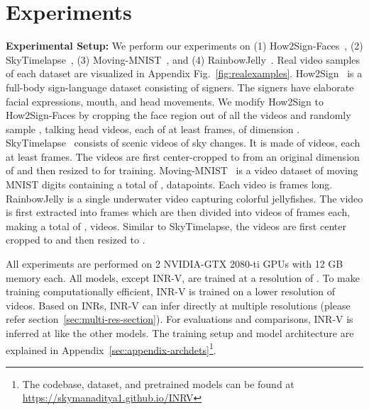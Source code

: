 \documentclass[10pt]{article} \usepackage[accepted]{tmlr}
\begin{document}
\section{Experiments}

\textbf{Experimental Setup: }
\label{exp_setup}
We perform our experiments on (1) How2Sign-Faces~\cite{how2sign}, (2) SkyTimelapse~\cite{skytimelapse}, (3) Moving-MNIST~\cite{moving-mnist}, and (4) RainbowJelly~\cite{stylegan-v}. Real video samples of each dataset are visualized in Appendix Fig.~\ref{fig:realexamples}. How2Sign~\cite{how2sign} is a full-body sign-language dataset consisting of  signers. The signers have elaborate facial expressions, mouth, and head movements. We modify How2Sign to How2Sign-Faces by cropping the face region out of all the videos and randomly sample , talking head videos, each of at least  frames, of dimension . SkyTimelapse~\cite{skytimelapse} consists of scenic videos of sky changes. It is made of  videos, each at least  frames. The videos are first center-cropped to  from an original dimension of  and then resized to  for training. Moving-MNIST~\cite{moving-mnist} is a video dataset of moving MNIST digits containing a total of , datapoints. Each video is  frames long.  
RainbowJelly is a single underwater video capturing colorful jellyfishes. The video is first extracted into frames which are then divided into videos of  frames each, making a total of , videos.
Similar to SkyTimelapse, the videos are first center cropped to  and then resized to .

All experiments are performed on 2 NVIDIA-GTX 2080-ti GPUs with 12 GB memory each. All models, except INR-V, are trained at a resolution of . To make training computationally efficient, INR-V is trained on a lower resolution of  videos. Based on INRs, INR-V can infer directly at multiple resolutions (please refer section~\ref{sec:multi-res-section}). For evaluations and comparisons, INR-V is inferred at  like the other models.  
The training setup and model architecture are explained in Appendix~\ref{sec:appendix-archdets}\def\thefootnote{}\footnote{The codebase, dataset, and pretrained models can be found at \textcolor{blue}{\href{https://skymanaditya1.github.io/INRV}{https://skymanaditya1.github.io/INRV}}}.
\end{document}
